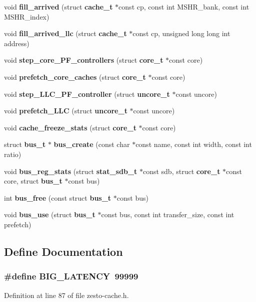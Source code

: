 \begin{CompactItemize}
\item 
void {\bf fill\_\-arrived} (struct {\bf cache\_\-t} $\ast$const cp, const int MSHR\_\-bank, const int MSHR\_\-index)
\item 
void {\bf fill\_\-arrived\_\-llc} (struct {\bf cache\_\-t} $\ast$const cp, unsigned long long int address)
\item 
void {\bf step\_\-core\_\-PF\_\-controllers} (struct {\bf core\_\-t} $\ast$const core)
\item 
void {\bf prefetch\_\-core\_\-caches} (struct {\bf core\_\-t} $\ast$const core)
\item 
void {\bf step\_\-LLC\_\-PF\_\-controller} (struct {\bf uncore\_\-t} $\ast$const uncore)
\item 
void {\bf prefetch\_\-LLC} (struct {\bf uncore\_\-t} $\ast$const uncore)
\item 
void {\bf cache\_\-freeze\_\-stats} (struct {\bf core\_\-t} $\ast$const core)
\item 
struct {\bf bus\_\-t} $\ast$ {\bf bus\_\-create} (const char $\ast$const name, const int width, const int ratio)
\item 
void {\bf bus\_\-reg\_\-stats} (struct {\bf stat\_\-sdb\_\-t} $\ast$const sdb, struct {\bf core\_\-t} $\ast$const core, struct {\bf bus\_\-t} $\ast$const bus)
\item 
int {\bf bus\_\-free} (const struct {\bf bus\_\-t} $\ast$const bus)
\item 
void {\bf bus\_\-use} (struct {\bf bus\_\-t} $\ast$const bus, const int transfer\_\-size, const int prefetch)
\end{CompactItemize}


\subsection{Define Documentation}
\subsubsection[{BIG\_\-LATENCY}]{\setlength{\rightskip}{0pt plus 5cm}\#define BIG\_\-LATENCY~99999}\label{zesto-cache_8h_8d2ff015ca2239311fb6533186242f9e}




Definition at line 87 of file zesto-cache.h.
